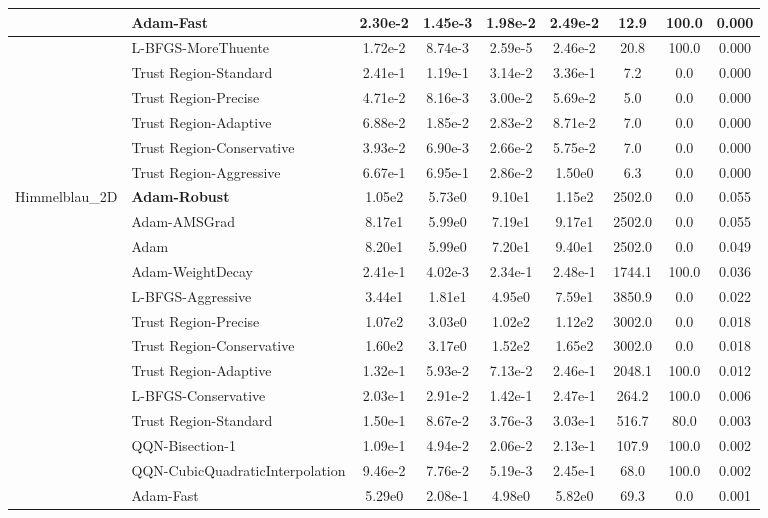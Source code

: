 \documentclass{article}
\begin{document}
\begin{longtable}{|l|l|c|c|c|c|c|c|c|}
\hline
 & Adam-Fast & 2.30e-2 & 1.45e-3 & 1.98e-2 & 2.49e-2 & 12.9 & 100.0 & 0.000 \\
\hline
 & L-BFGS-MoreThuente & 1.72e-2 & 8.74e-3 & 2.59e-5 & 2.46e-2 & 20.8 & 100.0 & 0.000 \\
\hline
 & Trust Region-Standard & 2.41e-1 & 1.19e-1 & 3.14e-2 & 3.36e-1 & 7.2 & 0.0 & 0.000 \\
\hline
 & Trust Region-Precise & 4.71e-2 & 8.16e-3 & 3.00e-2 & 5.69e-2 & 5.0 & 0.0 & 0.000 \\
\hline
 & Trust Region-Adaptive & 6.88e-2 & 1.85e-2 & 2.83e-2 & 8.71e-2 & 7.0 & 0.0 & 0.000 \\
\hline
 & Trust Region-Conservative & 3.93e-2 & 6.90e-3 & 2.66e-2 & 5.75e-2 & 7.0 & 0.0 & 0.000 \\
\hline
 & Trust Region-Aggressive & 6.67e-1 & 6.95e-1 & 2.86e-2 & 1.50e0 & 6.3 & 0.0 & 0.000 \\
Himmelblau\_2D & \textbf{Adam-Robust} & 1.05e2 & 5.73e0 & 9.10e1 & 1.15e2 & 2502.0 & 0.0 & 0.055 \\
\hline
 & Adam-AMSGrad & 8.17e1 & 5.99e0 & 7.19e1 & 9.17e1 & 2502.0 & 0.0 & 0.055 \\
\hline
 & Adam & 8.20e1 & 5.99e0 & 7.20e1 & 9.40e1 & 2502.0 & 0.0 & 0.049 \\
\hline
 & Adam-WeightDecay & 2.41e-1 & 4.02e-3 & 2.34e-1 & 2.48e-1 & 1744.1 & 100.0 & 0.036 \\
\hline
 & L-BFGS-Aggressive & 3.44e1 & 1.81e1 & 4.95e0 & 7.59e1 & 3850.9 & 0.0 & 0.022 \\
\hline
 & Trust Region-Precise & 1.07e2 & 3.03e0 & 1.02e2 & 1.12e2 & 3002.0 & 0.0 & 0.018 \\
\hline
 & Trust Region-Conservative & 1.60e2 & 3.17e0 & 1.52e2 & 1.65e2 & 3002.0 & 0.0 & 0.018 \\
\hline
 & Trust Region-Adaptive & 1.32e-1 & 5.93e-2 & 7.13e-2 & 2.46e-1 & 2048.1 & 100.0 & 0.012 \\
\hline
 & L-BFGS-Conservative & 2.03e-1 & 2.91e-2 & 1.42e-1 & 2.47e-1 & 264.2 & 100.0 & 0.006 \\
\hline
 & Trust Region-Standard & 1.50e-1 & 8.67e-2 & 3.76e-3 & 3.03e-1 & 516.7 & 80.0 & 0.003 \\
\hline
 & QQN-Bisection-1 & 1.09e-1 & 4.94e-2 & 2.06e-2 & 2.13e-1 & 107.9 & 100.0 & 0.002 \\
\hline
 & QQN-CubicQuadraticInterpolation & 9.46e-2 & 7.76e-2 & 5.19e-3 & 2.45e-1 & 68.0 & 100.0 & 0.002 \\
\hline
 & Adam-Fast & 5.29e0 & 2.08e-1 & 4.98e0 & 5.82e0 & 69.3 & 0.0 & 0.001 \\

\end{longtable}
\end{document}
